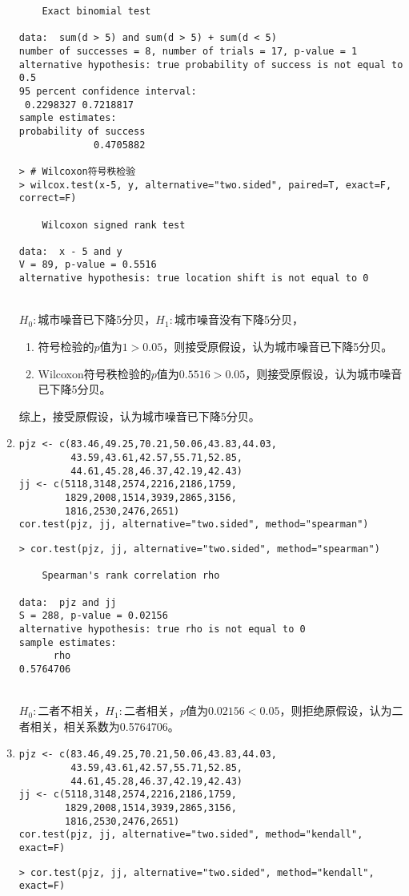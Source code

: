 \begin{enumerate}
\begin{lstlisting}
	Exact binomial test

data:  sum(d > 5) and sum(d > 5) + sum(d < 5)
number of successes = 8, number of trials = 17, p-value = 1
alternative hypothesis: true probability of success is not equal to 0.5
95 percent confidence interval:
 0.2298327 0.7218817
sample estimates:
probability of success 
             0.4705882 

> # Wilcoxon符号秩检验
> wilcox.test(x-5, y, alternative="two.sided", paired=T, exact=F, correct=F)

	Wilcoxon signed rank test

data:  x - 5 and y
V = 89, p-value = 0.5516
alternative hypothesis: true location shift is not equal to 0
\end{lstlisting}
        \summary\\
        $H_0:$城市噪音已下降5分贝，$H_1:$城市噪音没有下降5分贝，
        \begin{enumerate}[label=(\arabic*)]
          \item 符号检验的$p$值为$1>0.05$，则接受原假设，认为城市噪音已下降5分贝。
          \item Wilcoxon符号秩检验的$p$值为$0.5516>0.05$，则接受原假设，认为城市噪音已下降5分贝。
        \end{enumerate}
        综上，接受原假设，认为城市噪音已下降5分贝。
        \item
        \code
\begin{lstlisting}
pjz <- c(83.46,49.25,70.21,50.06,43.83,44.03,
         43.59,43.61,42.57,55.71,52.85,
         44.61,45.28,46.37,42.19,42.43)
jj <- c(5118,3148,2574,2216,2186,1759,
        1829,2008,1514,3939,2865,3156,
        1816,2530,2476,2651)
cor.test(pjz, jj, alternative="two.sided", method="spearman")
\end{lstlisting}
        \out
\begin{lstlisting}
> cor.test(pjz, jj, alternative="two.sided", method="spearman")

	Spearman's rank correlation rho

data:  pjz and jj
S = 288, p-value = 0.02156
alternative hypothesis: true rho is not equal to 0
sample estimates:
      rho 
0.5764706 
\end{lstlisting}
        \summary\\
        $H_0:$二者不相关，$H_1:$二者相关，$p$值为$0.02156<0.05$，则拒绝原假设，认为二者相关，相关系数为0.5764706。
        \item
        \code
\begin{lstlisting}
pjz <- c(83.46,49.25,70.21,50.06,43.83,44.03,
         43.59,43.61,42.57,55.71,52.85,
         44.61,45.28,46.37,42.19,42.43)
jj <- c(5118,3148,2574,2216,2186,1759,
        1829,2008,1514,3939,2865,3156,
        1816,2530,2476,2651)
cor.test(pjz, jj, alternative="two.sided", method="kendall", exact=F)
\end{lstlisting}
        \out
\begin{lstlisting}
> cor.test(pjz, jj, alternative="two.sided", method="kendall", exact=F)


\end{lstlisting}
\end{enumerate}
